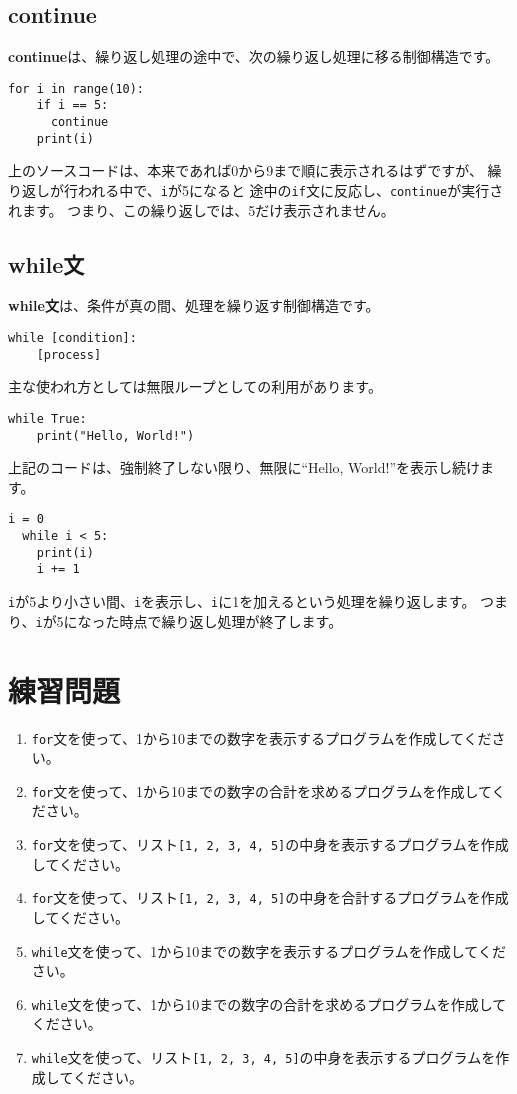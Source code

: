 \documentclass[a4paper,titlepage,dvipdfmx]{jarticle}
\begin{document}
\subsection{continue}
\textbf{continue}は、繰り返し処理の途中で、次の繰り返し処理に移る制御構造です。
\begin{lstlisting}[caption=continueの例,label=continue]
  for i in range(10):
    if i == 5:
      continue
    print(i)
\end{lstlisting}
上のソースコードは、本来であれば0から9まで順に表示されるはずですが、
繰り返しが行われる中で、\texttt{i}が5になると
途中の\texttt{if}文に反応し、\texttt{continue}が実行されます。
つまり、この繰り返しでは、5だけ表示されません。

\subsection{while文}
\textbf{while文}は、条件が真の間、処理を繰り返す制御構造です。
\begin{lstlisting}[caption=while文の構文]
  while [condition]:
    [process]
\end{lstlisting}
主な使われ方としては無限ループとしての利用があります。
\begin{lstlisting}[caption=無限ループの例,label=infinite]
  while True:
    print("Hello, World!")
\end{lstlisting}
上記のコードは、強制終了しない限り、無限に``Hello, World!''を表示し続けます。

\begin{lstlisting}[caption=while文の例,label=while]
  i = 0
  while i < 5:
    print(i)
    i += 1  
\end{lstlisting}
\texttt{i}が5より小さい間、\texttt{i}を表示し、\texttt{i}に1を加えるという処理を繰り返します。
つまり、\texttt{i}が5になった時点で繰り返し処理が終了します。

\section{練習問題}
\begin{enumerate}
  \item \texttt{for}文を使って、1から10までの数字を表示するプログラムを作成してください。
  \item \texttt{for}文を使って、1から10までの数字の合計を求めるプログラムを作成してください。
  \item \texttt{for}文を使って、リスト\texttt{[1, 2, 3, 4, 5]}の中身を表示するプログラムを作成してください。
  \item \texttt{for}文を使って、リスト\texttt{[1, 2, 3, 4, 5]}の中身を合計するプログラムを作成してください。
  \item \texttt{while}文を使って、1から10までの数字を表示するプログラムを作成してください。
  \item \texttt{while}文を使って、1から10までの数字の合計を求めるプログラムを作成してください。
  \item \texttt{while}文を使って、リスト\texttt{[1, 2, 3, 4, 5]}の中身を表示するプログラムを作成してください。
\end{enumerate}
\end{document}
